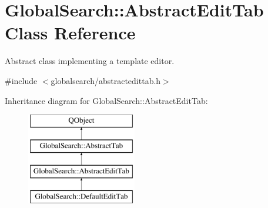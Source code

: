 \hypertarget{classGlobalSearch_1_1AbstractEditTab}{}\section{Global\+Search\+:\+:Abstract\+Edit\+Tab Class Reference}
\label{classGlobalSearch_1_1AbstractEditTab}


Abstract class implementing a template editor.  




{\ttfamily \#include $<$globalsearch/abstractedittab.\+h$>$}

Inheritance diagram for Global\+Search\+:\+:Abstract\+Edit\+Tab\+:\begin{figure}[H]
\begin{center}
\leavevmode
\includegraphics[height=4.000000cm]{classGlobalSearch_1_1AbstractEditTab}
\end{center}
\end{figure}
